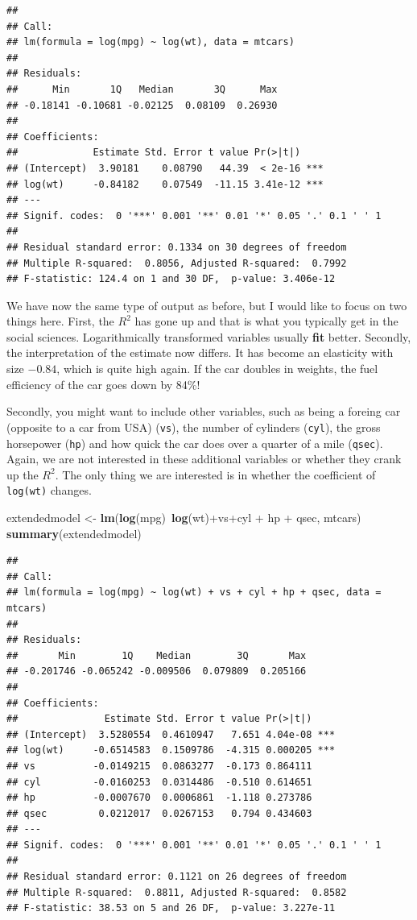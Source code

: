 \documentclass[]{article}
\newenvironment{Shaded}{\begin{snugshade}}{\end{snugshade}}
\newcommand{\KeywordTok}[1]{\textcolor[rgb]{0.13,0.29,0.53}{\textbf{{#1}}}}
\newcommand{\StringTok}[1]{\textcolor[rgb]{0.31,0.60,0.02}{{#1}}}
\newcommand{\NormalTok}[1]{{#1}}
\begin{document}
\begin{verbatim}
## 
## Call:
## lm(formula = log(mpg) ~ log(wt), data = mtcars)
## 
## Residuals:
##      Min       1Q   Median       3Q      Max 
## -0.18141 -0.10681 -0.02125  0.08109  0.26930 
## 
## Coefficients:
##             Estimate Std. Error t value Pr(>|t|)    
## (Intercept)  3.90181    0.08790   44.39  < 2e-16 ***
## log(wt)     -0.84182    0.07549  -11.15 3.41e-12 ***
## ---
## Signif. codes:  0 '***' 0.001 '**' 0.01 '*' 0.05 '.' 0.1 ' ' 1
## 
## Residual standard error: 0.1334 on 30 degrees of freedom
## Multiple R-squared:  0.8056, Adjusted R-squared:  0.7992 
## F-statistic: 124.4 on 1 and 30 DF,  p-value: 3.406e-12
\end{verbatim}

We have now the same type of output as before, but I would like to focus
on two things here. First, the \(R^2\) has gone up and that is what you
typically get in the social sciences. Logarithmically transformed
variables usually \textbf{fit} better. Secondly, the interpretation of
the estimate now differs. It has become an elasticity with size
\(-0.84\), which is quite high again. If the car doubles in weights, the
fuel efficiency of the car goes down by 84\%!

Secondly, you might want to include other variables, such as being a
foreing car (opposite to a car from USA) (\texttt{vs}), the number of
cylinders (\texttt{cyl}), the gross horsepower (\texttt{hp}) and how
quick the car does over a quarter of a mile (\texttt{qsec}). Again, we
are not interested in these additional variables or whether they crank
up the \(R^2\). The only thing we are interested is in whether the
coefficient of \texttt{log(wt)} changes.

\begin{Shaded}
\begin{Highlighting}[]
\NormalTok{extendedmodel <-}\StringTok{ }\KeywordTok{lm}\NormalTok{(}\KeywordTok{log}\NormalTok{(mpg)~}\KeywordTok{log}\NormalTok{(wt)+vs+cyl +}\StringTok{ }\NormalTok{hp +}\StringTok{ }\NormalTok{qsec, mtcars)}
\KeywordTok{summary}\NormalTok{(extendedmodel)}
\end{Highlighting}
\end{Shaded}

\begin{verbatim}
## 
## Call:
## lm(formula = log(mpg) ~ log(wt) + vs + cyl + hp + qsec, data = mtcars)
## 
## Residuals:
##       Min        1Q    Median        3Q       Max 
## -0.201746 -0.065242 -0.009506  0.079809  0.205166 
## 
## Coefficients:
##               Estimate Std. Error t value Pr(>|t|)    
## (Intercept)  3.5280554  0.4610947   7.651 4.04e-08 ***
## log(wt)     -0.6514583  0.1509786  -4.315 0.000205 ***
## vs          -0.0149215  0.0863277  -0.173 0.864111    
## cyl         -0.0160253  0.0314486  -0.510 0.614651    
## hp          -0.0007670  0.0006861  -1.118 0.273786    
## qsec         0.0212017  0.0267153   0.794 0.434603    
## ---
## Signif. codes:  0 '***' 0.001 '**' 0.01 '*' 0.05 '.' 0.1 ' ' 1
## 
## Residual standard error: 0.1121 on 26 degrees of freedom
## Multiple R-squared:  0.8811, Adjusted R-squared:  0.8582 
## F-statistic: 38.53 on 5 and 26 DF,  p-value: 3.227e-11
\end{verbatim}
\end{document}
